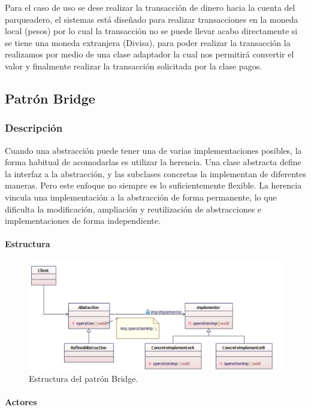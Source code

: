 Para el caso de uso se dese realizar la transacción de dinero hacia la cuenta del parqueadero, el sistemas está diseñado para realizar transacciones en la moneda local (pesos) por lo cual la transacción no se puede llevar acabo directamente si se tiene una moneda extranjera (Divisa), para poder realizar la transacción la realizamos por medio de una clase adaptador la cual nos permitirá convertir el valor y finalmente realizar la transacción solicitada por la clase pagos.

\subsection{Patrón Bridge}


\subsubsection{Descripción}
Cuando una abstracción puede tener una de varias implementaciones posibles, la forma habitual de acomodarlas es utilizar la herencia. Una clase abstracta define la interfaz a la abstracción, y las subclases concretas la implementan de diferentes maneras. Pero este enfoque no siempre es lo suficientemente flexible. La herencia vincula una implementación a la abstracción de forma permanente, lo que dificulta la modificación, ampliación y reutilización de abstracciones e implementaciones de forma independiente.

\paragraph{Estructura}

\begin{figure}[th!]
	\centering
	\includegraphics[width=.7\linewidth]{imagenes/Patrones/Bridge.pdf}
	\caption{Estructura del patrón Bridge.\cite{gof}}	
\end{figure}

\paragraph{Actores}


